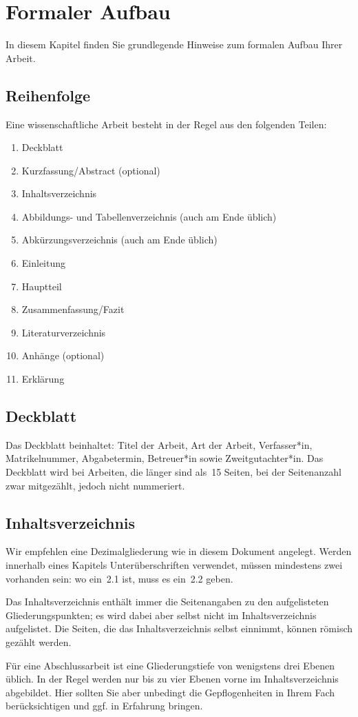 \chapter{Formaler Aufbau}
\label{chap:formal}
%
In diesem Kapitel finden Sie grundlegende Hinweise zum formalen Aufbau Ihrer Arbeit.
%
\section{Reihenfolge}
\label{sec:aufbau}
Eine wissenschaftliche Arbeit besteht in der Regel aus den folgenden Teilen:
%
\begin{enumerate}
 \item Deckblatt
 \item Kurzfassung/Abstract (optional)
 \item Inhaltsverzeichnis
 \item Abbildungs- und Tabellenverzeichnis (auch am Ende üblich)
 \item Abkürzungsverzeichnis (auch am Ende üblich)
 \item Einleitung
 \item Hauptteil
 \item Zusammenfassung/Fazit
 \item Literaturverzeichnis
 \item Anhänge (optional)
 \item Erklärung
\end{enumerate}
%
%
\section{Deckblatt}
Das Deckblatt beinhaltet: Titel der Arbeit, Art der Arbeit, Verfasser*in, Matrikelnummer, Abgabetermin, Betreuer*in sowie Zweitgutachter*in. Das Deckblatt wird bei Arbeiten, die länger sind als~15 Seiten, bei der Seitenanzahl zwar mitgezählt, jedoch nicht nummeriert.
%
%
\section{Inhaltsverzeichnis}
\label{sec:listOfContents}
Wir empfehlen eine Dezimalgliederung wie in diesem Dokument angelegt. Werden innerhalb eines Kapitels Unterüberschriften verwendet, müssen mindestens zwei vorhanden sein: wo ein~2.1 ist, muss es ein~2.2 geben.
\par
Das Inhaltsverzeichnis enthält immer die Seitenangaben zu den aufgelisteten Gliederungspunkten; es wird dabei aber selbst nicht im Inhaltsverzeichnis aufgelistet. Die Seiten, die das Inhaltsverzeichnis selbst einnimmt, können römisch gezählt werden.
\par
Für eine Abschlussarbeit ist eine Gliederungstiefe von wenigstens drei Ebenen üblich. In der Regel werden nur bis zu vier Ebenen vorne im Inhaltsverzeichnis abgebildet. Hier sollten Sie aber unbedingt die Gepflogenheiten in Ihrem Fach berücksichtigen und ggf. in Erfahrung bringen.
%
%

